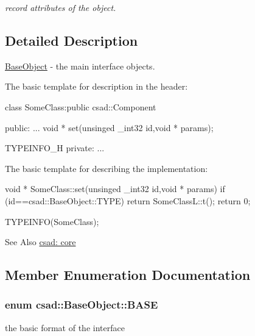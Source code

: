 \begin{DoxyCompactItemize}
\begin{DoxyCompactList}\small\item\em record attributes of the object. \end{DoxyCompactList}\end{DoxyCompactItemize}


\subsection{Detailed Description}
\hyperlink{classcsad_1_1_base_object}{Base\-Object} -\/ the main interface objects. 

The basic template for description in the header\-: \begin{DoxyVerb}  class SomeClass:public csad::Component {
     public:
     ...
         void * set(unsinged _int32 id,void * params);

      TYPEINFO_H
     private:
     ...
  }
\end{DoxyVerb}


The basic template for describing the implementation\-: \begin{DoxyVerb}  void * SomeClass::set(unsinged _int32 id,void * params)
  {
     if (id==csad::BaseObject::TYPE) return SomeClassL::t();
     return 0;
  }

  TYPEINFO(SomeClass);
\end{DoxyVerb}


\begin{DoxySeeAlso}{See Also}
\hyperlink{group__core}{csad\-: core} 
\end{DoxySeeAlso}


\subsection{Member Enumeration Documentation}
\hypertarget{classcsad_1_1_base_object_a27d9db492c1a385aa4086da1824e2737}{
\subsubsection[{B\-A\-S\-E}]{\setlength{\rightskip}{0pt plus 5cm}enum {\bf csad\-::\-Base\-Object\-::\-B\-A\-S\-E}}}\label{classcsad_1_1_base_object_a27d9db492c1a385aa4086da1824e2737}


the basic format of the interface 

